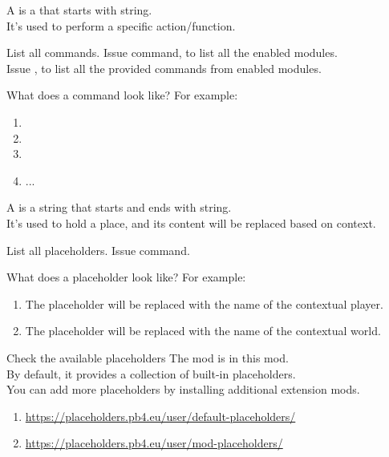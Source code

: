 \clearpage
{}\label{sec:command}

A  is a  that starts with \str{/} string. \\
It's used to perform a specific action/function.\\

\begin{tips}{List all commands.}
    Issue  command, to list all the enabled modules.\\
    Issue , to list all the provided commands from enabled modules.
\end{tips}

\begin{example}{What does a command look like?}
    For example:
    \begin{enumerate}
        \item {}
        \item {}
        \item {}
        \item {...}
    \end{enumerate}
\end{example}


\clearpage
{}

A  is a string that starts and ends with \str{\%} string. \\
It's used to hold a place, and its content will be replaced based on context.

\begin{tips}{List all placeholders.}
    Issue  command.
\end{tips}

\begin{example}{What does a placeholder look like?}
    For example:
    \begin{enumerate}
        \item {The placeholder  will be replaced with the name of the contextual player.}
        \item {The placeholder  will be replaced with the name of the contextual world.}
    \end{enumerate}
\end{example}

\begin{tips}{Check the available placeholders}
    The  mod is  in this mod. \\
    By default, it provides a collection of built-in placeholders. \\
    You can add more placeholders by installing additional extension mods.
    \begin{enumerate}
        \item \url{https://placeholders.pb4.eu/user/default-placeholders/}
        \item \url{https://placeholders.pb4.eu/user/mod-placeholders/}
    \end{enumerate}
\end{tips}


